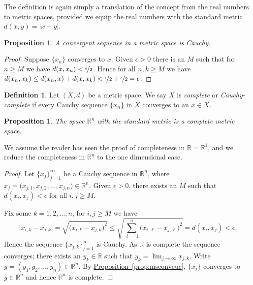 \documentclass[12pt,openany]{book}
\newcommand{\abs}[1]{\left\lvert {#1} \right\rvert}
\newcommand{\R}{{\mathbb{R}}}
\newcommand{\myindex}[1]{#1\index{#1}}
\theoremstyle{plain}
\newtheorem{prop}[thm]{Proposition}
\theoremstyle{remark}
\theoremstyle{definition}
\newtheorem{defn}[thm]{Definition}
\theoremstyle{exercise}
\theoremstyle{example}
\newcommand{\propref}[1]{\hyperref[#1]{Proposition~\ref*{#1}}}
\begin{document}
The definition is again simply a translation of the concept
from the real numbers to metric spaces,
provided we equip the real numbers with
the standard metric $d(x,y) = \abs{x-y}$.

\begin{prop}
A convergent sequence in a metric space is Cauchy.
\end{prop}

\begin{proof}
Suppose $\{ x_n \}$ converges to $x$.
Given $\epsilon > 0$ there is an $M$ such that for $n \geq M$
we have $d(x,x_n) < \nicefrac{\epsilon}{2}$.  Hence
for all $n,k \geq M$ we have
$d(x_n,x_k) \leq d(x_n,x) + d(x,x_k) < \nicefrac{\epsilon}{2} +
\nicefrac{\epsilon}{2} = \epsilon$.
\end{proof}

\begin{defn}
Let $(X,d)$ be a metric space.  We say $X$ is
\emph{\myindex{complete}} or \emph{\myindex{Cauchy-complete}}
if every Cauchy sequence $\{ x_n \}$ in $X$
converges to an $x \in X$.
\end{defn}

\begin{prop}
The space $\R^n$ with the standard metric is a complete metric space.
\end{prop}

We assume the reader has seen the proof of completeness in $\R = \R^1$,
and we reduce the completeness in $\R^n$ to the one dimensional case.

\begin{proof}
Let $\{ x_j \}_{j=1}^\infty$ be a Cauchy sequence
in $\R^n$, where $x_j = \bigl(x_{j,1},x_{j,2},\ldots,x_{j,n}\bigr) \in \R^n$.
Given $\epsilon > 0$, there exists an $M$ such that
$d(x_i,x_j) < \epsilon$
for all
$i,j \geq M$.

Fix some $k=1,2,\ldots,n$, for $i,j \geq M$ we have
\begin{equation*}
\bigl\lvert x_{i,k} - x_{j,k} \bigr\rvert
=
\sqrt{{\bigl(x_{i,k} - x_{j,k}\bigr)}^2}
\leq
\sqrt{\sum_{\ell=1}^n {\bigl(x_{i,\ell}-x_{j,\ell}\bigr)}^2}
= d(x_i,x_j) < \epsilon .
\end{equation*}
Hence the sequence $\{ x_{j,k} \}_{j=1}^\infty$ is Cauchy.  As $\R$ is
complete the sequence converges; there exists an $y_k \in \R$ such that
$y_k = \lim_{j\to\infty} x_{j,k}$.
Write $y = (y_1,y_2,\ldots,y_n) \in \R^n$.
By \propref{prop:msconveuc}, $\{ x_j \}$ converges
to $y \in \R^n$ and hence $\R^n$ is complete.
\end{proof}
\end{document}
